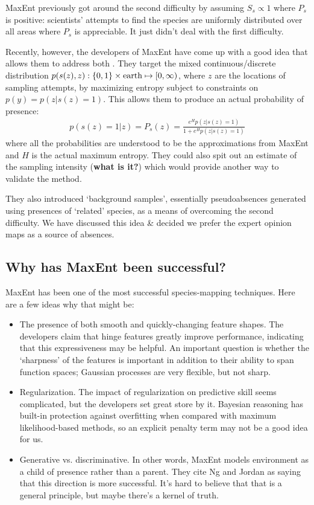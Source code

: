 MaxEnt previously got around the second difficulty by assuming $S_s\propto 1$ where $P_s$ is positive: scientists' attempts to find the species are uniformly distributed over all areas where $P_s$ is appreciable. It just didn't deal with the first difficulty. 

Recently, however, the developers of MaxEnt have come up with a good idea that allows them to address both \cite{Phillips:2008p12219}. They target the mixed continuous/discrete distribution $p(s(z), z) : \{0,1\}\times\textup{earth}\mapsto [0,\infty)$, where $z$ are the locations of sampling attempts, by maximizing entropy subject to constraints on $p(y)=p(z|s(z)=1)$. This allows them to produce an actual probability of presence:
\begin{eqnarray*}
    p(s(z)=1|z) = P_s(z)=\frac{e^H p(z|s(z)=1)}{1+e^H p(z|s(z)=1)}
\end{eqnarray*}
where all the probabilities are understood to be the approximations from MaxEnt and $H$ is the actual maximum entropy. They could also spit out an estimate of the sampling intensity (\textbf{what is it?}) which would provide another way to validate the method.

They also introduced `background samples', essentially pseudoabsences generated using presences of `related' species, as a means of overcoming the second difficulty. We have discussed this idea \& decided we prefer the expert opinion maps as a source of absences.


\subsection{Why has MaxEnt been successful?}
MaxEnt has been one of the most successful species-mapping techniques. Here are a few ideas why that might be:
\begin{itemize}
    \item The presence of both smooth and quickly-changing feature shapes. The developers claim that hinge features greatly improve performance, indicating that this expressiveness may be helpful. An important question is whether the `sharpness' of the features is important in addition to their ability to span function spaces; Gaussian processes are very flexible, but not sharp.
    \item Regularization. The impact of regularization on predictive skill seems complicated, but the developers set great store by it. Bayesian reasoning has built-in protection against overfitting when compared with maximum likelihood-based methods, so an explicit penalty term may not be a good idea for us.
    \item Generative vs. discriminative. In other words, MaxEnt models environment as a child of presence rather than a parent. They cite Ng and Jordan as saying that this direction is more successful. It's hard to believe that that is a general principle, but maybe there's a kernel of truth. 
\end{itemize}


